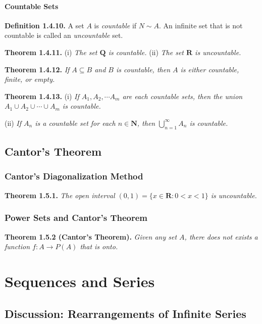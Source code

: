 \documentclass[12pt]{report}
\newcommand{\R}{\textbf{R}}
\newcommand{\N}{\textbf{N}}
\newcommand{\Q}{\textbf{Q}}
\begin{document}
\subsubsection*{Countable Sets}

\noindent \textbf{Definition 1.4.10.} A set $A$ is \textit{countable} if $N\sim A$. An infinite set that is not countable is called an \textit{uncountable} set.
\bigskip

\noindent \textbf{Theorem 1.4.11.} (i) \textit{The set $\Q$ is countable.} (ii) \textit{The set $\R$ is uncountable.}
\bigskip

\noindent \textbf{Theorem 1.4.12.} \textit{If $A\subseteq B$ and $B$ is countable, then $A$ is either countable, finite, or empty.}
\bigskip

\noindent \textbf{Theorem 1.4.13.} (i) \textit{If $A_1,A_2,\cdots A_m$ are each countable sets, then the union $A_1\cup A_2\cup\cdots\cup A_m$ is countable.}
\bigskip

(ii) \textit{If $A_n$ is a countable set for each $n\in\N$, then $\bigcup_{n=1}^\infty A_n$ is countable.}
\bigskip

\section{Cantor's Theorem}

\subsection*{Cantor's Diagonalization Method}

\noindent \textbf{Theorem 1.5.1.} \textit{The open interval $(0,1)=\{x\in\R:0<x<1\}$ is uncountable.}
\bigskip

\subsection*{Power Sets and Cantor's Theorem}

\noindent \textbf{Theorem 1.5.2 (Cantor's Theorem).} \textit{Given any set $A$, there does not exists a function $f:A\rightarrow P(A)$ that is onto.}
\bigskip

\chapter{Sequences and Series}
\section{Discussion: Rearrangements of Infinite Series}
\end{document}
